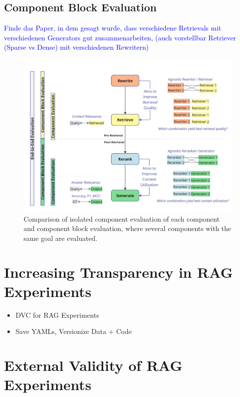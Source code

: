\subsection{Component Block Evaluation}
\textcolor{blue}{Finde das Paper, in dem gesagt wurde, dass verschiedene Retrievals mit verschiedenen Generators gut zusammenarbeiten, (auch vorstellbar Retriever (Sparse vs Dense) mit verschiedenen Rewritern)}

\begin{figure}
  \centering
  \includegraphics[width=\textwidth]{images/ComponentBlockEvaluation.pdf}
  \caption{Comparison of isolated component evaluation of each component and component block evaluation, where several components with the same goal are evaluated.}
  \label{fig:componentblockeval}
\end{figure}

\section{Increasing Transparency in RAG Experiments}

\begin{itemize}
    \item DVC for RAG Experiments
    \item Save YAMLs, Versionize Data + Code
\end{itemize}

\section{External Validity of RAG Experiments}

